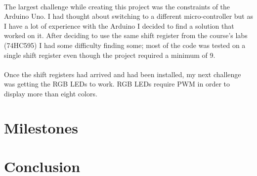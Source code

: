 \documentclass[12pt,a4paper]{article}
\begin{document}
		\paragraph{}
			The largest challenge while creating this project was the constraints of the Arduino Uno. I had thought about switching to a different micro-controller but as I have a lot of experience with the Arduino I decided to find a solution that worked on it. After deciding to use the same shift register from the course's labs (74HC595) I had some difficulty finding some; most of the code was tested on a single shift register even though the project required a minimum of 9.
    \paragraph{}
      Once the shift registers had arrived and had been installed, my next challenge was getting the \gls{RGB} \glspl{LED} to work. \gls{RGB} \glspl{LED} require \gls{PWM} in order to display more than eight colors.

	\section{Milestones}
	\section{Conclusion}
\end{document}
